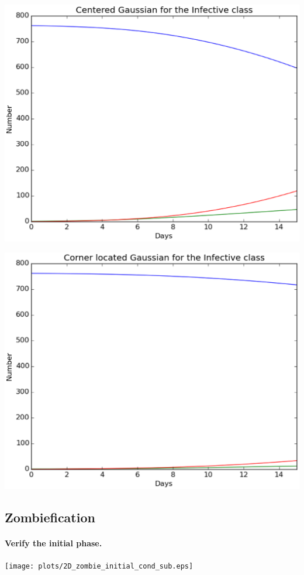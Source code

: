 \documentclass[%
twoside,                 %
final,                   %
10pt]{article}
\begin{document}
\begin{center}  %
  \centerline{\includegraphics[width=0.8\linewidth]{plots/2D_british_school_gauss_long_number.eps}}
\end{center}



\begin{center}  %
  \centerline{\includegraphics[width=0.8\linewidth]{plots/2D_british_school_gauss_corner_long_number.eps}}
\end{center}


\subsection{Zombiefication}
\paragraph{Verify the initial phase.}
\begin{center}  %
  \centerline{\texttt{[image: plots/2D\_zombie\_initial\_cond\_sub.eps]}}
\end{center}
\end{document}

